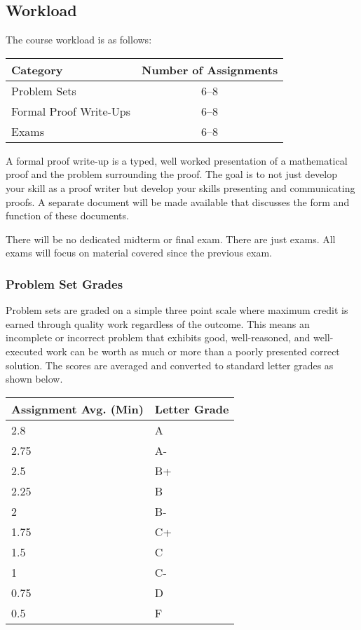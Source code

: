 \documentclass[10pt]{article}
\begin{document}
\subsection{Workload}

The course workload is as follows:
\begin{center}
  \begin{tabular}{lc}
    Category & Number of Assignments \\ \toprule
    Problem Sets & 6--8 \\
    Formal Proof Write-Ups & 6--8 \\
    Exams & 6--8
  \end{tabular}
\end{center}

A formal proof write-up is a typed, well worked presentation of a mathematical proof and the problem surrounding the proof. The goal is to not just develop your skill as a proof writer but develop your skills presenting and communicating proofs. A separate document will be made available that discusses the form and function of these documents.

There will be no dedicated midterm or final exam. There are just exams.  All exams will focus on material covered since the previous exam.

\subsubsection{Problem Set Grades}

Problem sets are graded on a simple three point scale where maximum credit is earned through quality work regardless of the outcome.  This means an incomplete or incorrect problem that exhibits good, well-reasoned, and well-executed work can be worth as much or more than a poorly presented correct solution. The scores are averaged and converted to standard letter grades as shown below.

\begin{center}
\begin{small}
\begin{tabular}{ll}
Assignment Avg. (Min) & Letter Grade \\ \toprule
2.8   & A  \\
2.75    & A- \\
2.5 & B+ \\
2.25    & B  \\
2   & B- \\
1.75    & C+ \\
1.5 & C  \\
1   & C- \\
0.75    & D  \\
0.5  & F
\end{tabular}
\end{small}
\end{center}
\end{document}
